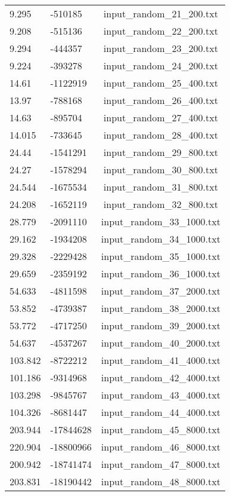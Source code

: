 \begin{longtable}[hb]{|l|l|c|}
    9.295 & -510185 & input\_random\_21\_200.txt \\
    9.208 & -515136 & input\_random\_22\_200.txt \\
    9.294 & -444357 & input\_random\_23\_200.txt \\
    9.224 & -393278 & input\_random\_24\_200.txt \\
    14.61 & -1122919 & input\_random\_25\_400.txt \\
    13.97 & -788168 & input\_random\_26\_400.txt \\
    14.63 & -895704 & input\_random\_27\_400.txt \\
    14.015 & -733645 & input\_random\_28\_400.txt \\
    24.44 & -1541291 & input\_random\_29\_800.txt \\
    24.27 & -1578294 & input\_random\_30\_800.txt \\
    24.544 & -1675534 & input\_random\_31\_800.txt \\
    24.208 & -1652119 & input\_random\_32\_800.txt \\
    28.779 & -2091110 & input\_random\_33\_1000.txt \\
    29.162 & -1934208 & input\_random\_34\_1000.txt \\
    29.328 & -2229428 & input\_random\_35\_1000.txt \\
    29.659 & -2359192 & input\_random\_36\_1000.txt \\
    54.633 & -4811598 & input\_random\_37\_2000.txt \\
    53.852 & -4739387 & input\_random\_38\_2000.txt \\
    53.772 & -4717250 & input\_random\_39\_2000.txt \\
    54.637 & -4537267 & input\_random\_40\_2000.txt \\
    103.842 & -8722212 & input\_random\_41\_4000.txt \\
    101.186 & -9314968 & input\_random\_42\_4000.txt \\
    103.298 & -9845767 & input\_random\_43\_4000.txt \\
    104.326 & -8681447 & input\_random\_44\_4000.txt \\
    203.944 & -17844628 & input\_random\_45\_8000.txt \\
    220.904 & -18800966 & input\_random\_46\_8000.txt \\
    200.942 & -18741474 & input\_random\_47\_8000.txt \\
    203.831 & -18190442 & input\_random\_48\_8000.txt \\

\end{longtable}
